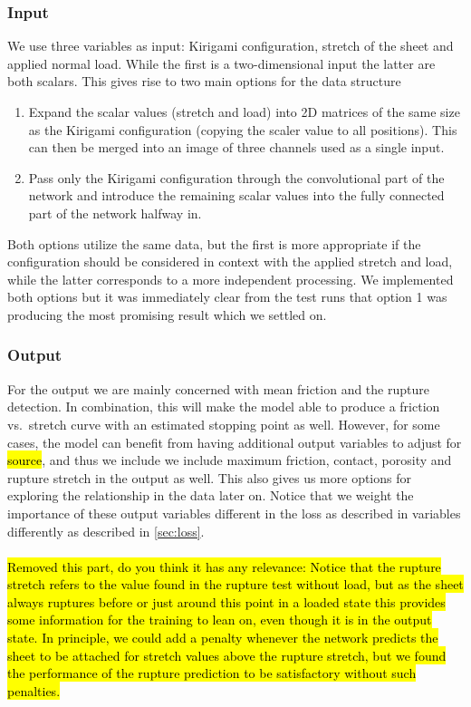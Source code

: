 \subsubsection{Input}
We use three variables as input: Kirigami configuration, stretch of the sheet
and applied normal load. While the first is a two-dimensional input the latter
are both scalars. This gives rise to two main options for the data structure
\begin{enumerate}
  \item Expand the scalar values (stretch and load) into 2D matrices of the same
  size as the Kirigami configuration (copying the scaler value to all positions). This can then be merged into an image of three channels used as a single input.  
  \item Pass only the Kirigami configuration through the convolutional part of the network and introduce the remaining scalar values into the fully connected part of the network halfway in. 
\end{enumerate}
Both options utilize the same data, but the first is more appropriate if the configuration should be considered in context with the applied stretch and load, while the latter corresponds to a more independent processing. We implemented both options but it was immediately clear from the test runs that option 1 was producing the most promising result which we settled on.

\subsubsection{Output}
For the output we are mainly concerned with mean friction and the rupture
detection. In combination, this will make the model able to produce a friction vs.\ stretch curve with an estimated stopping point as well. However, for some cases, the model can benefit from having additional output variables to adjust for \hl{source}, and thus we include we include maximum friction, contact, porosity and rupture stretch in the output as well. This also gives us more options for exploring the relationship in the data later on. Notice that we weight the importance of these output variables different in the loss as described in 
variables differently as described in \cref{sec:loss}. 
\\
\\
\hl{Removed this part, do you think it has any relevance: Notice that the rupture stretch refers to the value found in the rupture test without load, but as the sheet always ruptures before or just around this point in a loaded state this provides some information for the training to lean on, even though it is in the output state. In principle, we could add a penalty whenever the network predicts the sheet to be attached for stretch values above the rupture stretch, but we found the performance of the rupture prediction to be satisfactory without such penalties.}


